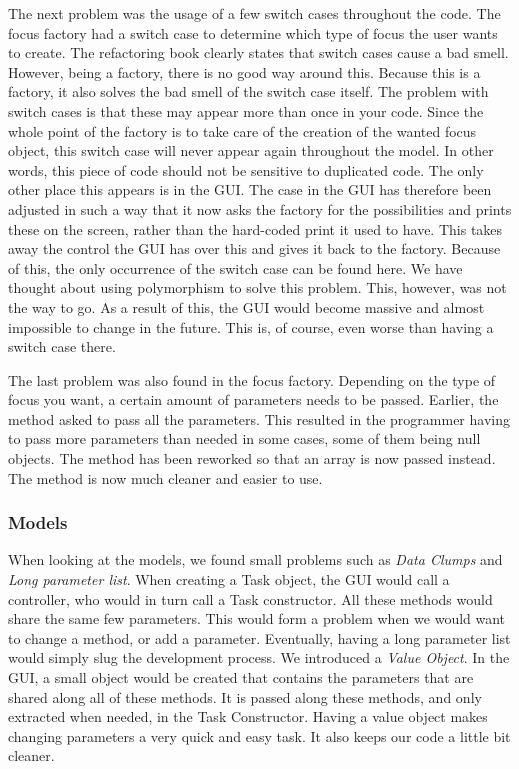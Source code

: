 				The next problem was the usage of a few switch cases throughout the code. The focus factory had a switch case to determine which type of focus the user wants to create. The refactoring book clearly states that switch cases cause a bad smell. However, being a factory, there is no good way around this. Because this is a factory, it also solves the bad smell of the switch case itself. The problem with switch cases is that these may appear more than once in your code. Since the whole point of the factory is to take care of the creation of the wanted focus object, this switch case will never appear again throughout the model.  In other words, this piece of code should not be sensitive to duplicated code. The only other place this appears is in the GUI. The case in the GUI has therefore been adjusted in such a way that it now asks the factory for the possibilities and prints these on the screen, rather than the hard-coded print it used to have. This takes away the control the GUI has over this and gives it back to the factory. Because of this, the only occurrence of the switch case can be found here. 
				We have thought about using polymorphism to solve this problem. This, however, was not the way to go. As a result of this, the GUI would become massive and almost impossible to change in the future. This is, of course, even worse than having a switch case there.
				
				The last problem was also found in the focus factory. Depending on the type of focus you want, a certain amount of parameters needs to be passed. Earlier, the method asked to pass all the parameters. This resulted in the programmer having to pass more parameters than needed in some cases, some of them being null objects. The method has been reworked so that an array is now passed instead. The method is now much cleaner and easier to use.
				
				\subsubsection{Models}
				When looking at the models, we found small problems such as \emph{Data Clumps}
				and \emph{Long parameter list}.
				When creating a Task object, the GUI would call a controller, who would in turn call a
				Task constructor. All these methods would
				share the same few parameters.
				This would form a problem when we would want to change a method, or add a
				parameter. Eventually, having a long parameter list would simply slug the
				development process.
				We introduced a \emph{Value Object}. In the GUI, a small object would be created that contains the parameters that are shared along all of these methods.
				It is passed along these methods, and only extracted when needed, in the Task
				Constructor.
				Having a value object makes changing parameters a very quick and easy task. It
				also keeps our code a little bit cleaner.
				
